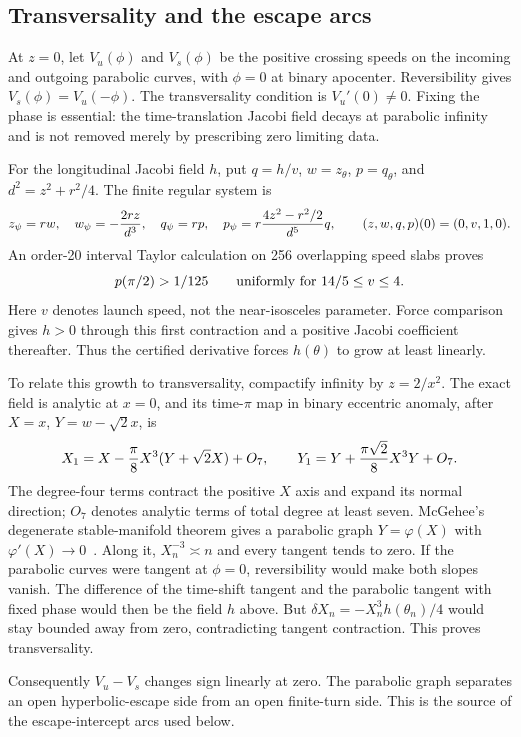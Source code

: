\subsection{Transversality and the escape arcs}

At $z=0$, let $V_u(\phi)$ and $V_s(\phi)$ be the positive crossing
speeds on the incoming and outgoing parabolic curves, with $\phi=0$ at
binary apocenter. Reversibility gives $V_s(\phi)=V_u(-\phi)$.
The transversality condition is $V_u'(0)\ne0$. Fixing the phase is
essential: the time-translation Jacobi field decays at parabolic infinity
and is not removed merely by prescribing zero limiting data.

For the longitudinal Jacobi field $h$, put $q=h/v$, $w=z_\theta$,
$p=q_\theta$, and $d^2=z^2+r^2/4$. The finite regular system is
\[
 z_\psi=rw,\quad w_\psi=-{2rz\over d^3},\quad
 q_\psi=rp,\quad p_\psi=r{4z^2-r^2/2\over d^5}q,
 \qquad(z,w,q,p)(0)=(0,v,1,0).
\]
An order-20 interval Taylor calculation on 256 overlapping speed slabs
proves
\[
 p(\pi/2)>1/125\qquad\hbox{uniformly for }14/5\le v\le4.
\]
Here $v$ denotes launch speed, not the near-isosceles parameter.
Force comparison gives $h>0$ through this first contraction and a positive
Jacobi coefficient thereafter. Thus the certified derivative forces
$h(\theta)$ to grow at least linearly.

To relate this growth to transversality, compactify infinity by $z=2/x^2$.
The exact field is analytic at $x=0$, and its time-$\pi$ map in binary
eccentric anomaly, after $X=x$, $Y=w-\sqrt2x$, is
\[
 X_1=X-{\pi\over8}X^3(Y+\sqrt2X)+O_7,\qquad
 Y_1=Y+{\pi\sqrt2\over8}X^3Y+O_7.
\]
The degree-four terms contract the positive $X$ axis and expand its normal
direction; $O_7$ denotes analytic terms of total degree at least seven.
McGehee's degenerate stable-manifold theorem gives a parabolic
graph $Y=\varphi(X)$ with $\varphi'(X)\to0$~\cite{McGehee1973}.
Along it, $X_n^{-3}\asymp n$ and every tangent tends to zero.
If the parabolic curves were tangent at $\phi=0$, reversibility would
make both slopes vanish. The difference of the time-shift tangent and
the parabolic tangent with fixed phase would then be the field $h$ above.
But $\delta X_n=-X_n^3h(\theta_n)/4$ would stay bounded away from zero,
contradicting tangent contraction. This proves transversality.

Consequently $V_u-V_s$ changes sign linearly at zero. The parabolic graph
separates an open hyperbolic-escape side from an open finite-turn side.
This is the source of the escape-intercept arcs used below.


